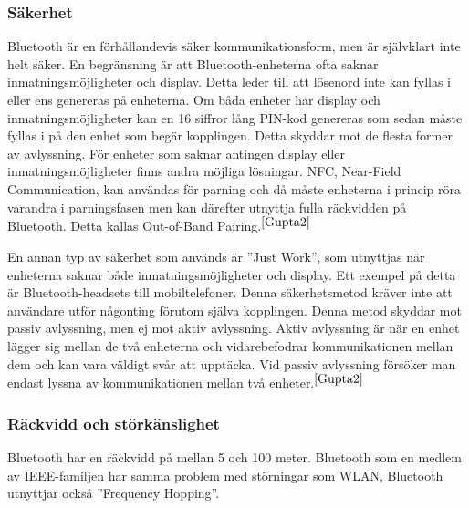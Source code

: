 \documentclass[a4paper,12pt,fleqn]{article}
\begin{document}
\subsubsection{Säkerhet}
Bluetooth är en förhållandevis säker kommunikationsform, men är självklart inte helt säker. En begränsning är att Bluetooth-enheterna ofta saknar inmatningsmöjligheter och display. Detta leder till att lösenord inte kan fyllas i eller ens genereras på enheterna. Om båda enheter har display och inmatningsmöjligheter kan en 16 siffror lång PIN-kod genereras som sedan måste fyllas i på den enhet som begär kopplingen. Detta skyddar mot de flesta former av avlyssning.
För enheter som saknar antingen display eller inmatningsmöjligheter finns andra möjliga lösningar. NFC, Near-Field Communication, kan användas för parning och då måste enheterna i princip röra varandra i parningsfasen men kan därefter utnyttja fulla räckvidden på Bluetooth. Detta kallas Out-of-Band Pairing.$^{\ref{Gupta2}}$

En annan typ av säkerhet som används är ''Just Work'', som utnyttjas när enheterna saknar både inmatningsmöjligheter och display. Ett exempel på detta är Bluetooth-headsets till mobiltelefoner. Denna säkerhetsmetod kräver inte att användare utför någonting förutom själva kopplingen. Denna metod skyddar mot passiv avlyssning, men ej mot aktiv avlyssning. 
Aktiv avlyssning är när en enhet lägger sig mellan de två enheterna och vidarebefodrar kommunikationen mellan dem och kan vara väldigt svår att upptäcka.
Vid passiv avlyssning försöker man endast lyssna av kommunikationen mellan två enheter.$^{\ref{Gupta2}}$

\subsubsection{Räckvidd och störkänslighet}

Bluetooth har en räckvidd på mellan 5 och 100 meter.
Bluetooth som en medlem av IEEE-familjen har samma problem med störningar som WLAN, Bluetooth utnyttjar också ''Frequency Hopping''.
\end{document}
